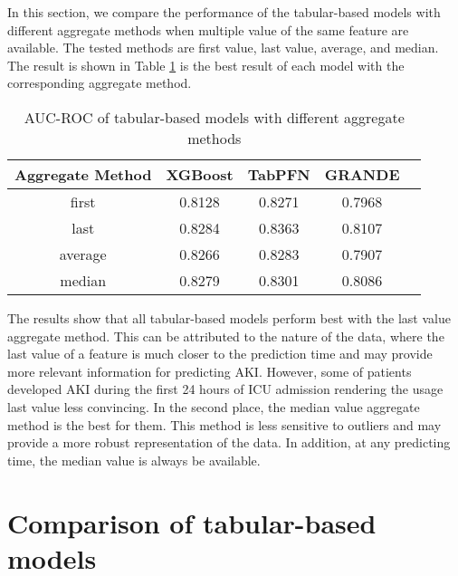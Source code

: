 \documentclass[../main.tex]{subfiles}
\begin{document}
In this section, we compare the performance of the tabular-based models with different aggregate methods when multiple value of the same feature are available.
The tested methods are first value, last value, average, and median.
The result is shown in Table \ref{tab:aggregate_methods} is the best result of each model with the corresponding aggregate method.

\begin{table}[H]
    \centering
    \caption{AUC-ROC of tabular-based models with different aggregate methods}
    \label{tab:aggregate_methods}
    \begin{tabular}{|c|c|c|c|c|}
        \hline
        \textbf{Aggregate Method} & 
        \textbf{XGBoost} & 
        \textbf{TabPFN} & 
        \textbf{GRANDE} \\
        \hline

        first & 
        0.8128 & 
        0.8271 & 
        0.7968 \\

        last & 
        0.8284 & 
        0.8363 & 
        0.8107 \\

        average & 
        0.8266 & 
        0.8283 & 
        0.7907 \\

        median &
        0.8279 &
        0.8301 &
        0.8086 \\

        \hline
    \end{tabular}
\end{table}

The results show that all tabular-based models perform best with the last value aggregate method.
This can be attributed to the nature of the data, where the last value of a feature is much closer to the prediction time and may provide more relevant information for predicting AKI.
However, some of patients developed AKI during the first 24 hours of ICU admission rendering the usage last value less convincing.
In the second place, the median value aggregate method is the best for them.
This method is less sensitive to outliers and may provide a more robust representation of the data.
In addition, at any predicting time, the median value is always be available.


\section{Comparison of tabular-based models}
\end{document}
